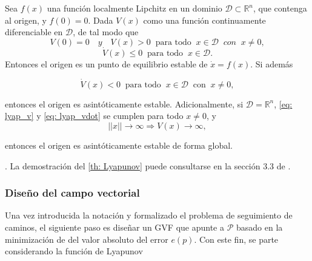 \begin{theorem}
    \label{th: Lyapunov}
    Sea $f(x)$ una función localmente Lipchitz en un dominio $\mathcal{D} \subset \mathds{R}^n$, que contenga al origen, y $f(0) = 0$. Dada $V(x)$ como una función continuamente diferenciable en $\mathcal{D}$, de tal modo que
    \begin{equation} \label{eq: lyap_v}
        V(0) = 0 \quad \textit{y} \quad V(x) > 0 \;\; \text{para todo} \;\; x \in \mathcal{D} \;\; con \;\; x \neq 0,
    \end{equation} 
    \begin{equation} \label{eq: lyap_vdot}
        \dot V(x) \leq 0 \;\; \text{para todo} \;\; x \in \mathcal{D}.
    \end{equation}
    Entonces el origen es un punto de equilibrio estable de $\dot x = f(x)$. Si además

    \begin{equation}
        \dot V(x) < 0 \;\; \text{para todo} \;\; x \in \mathcal{D} \;\; \text{con} \;\; x \neq 0,
    \end{equation}

    entonces el origen es asintóticamente estable. Adicionalmente, si $\mathcal{D} = \mathds{R}^n$, \eqref{eq: lyap_v} y \eqref{eq: lyap_vdot} se cumplen para todo $x \neq 0$, y
    \begin{equation}
        ||x|| \rightarrow \infty \Rightarrow V(x) \rightarrow \infty,
    \end{equation}

    entonces el origen es asintóticamente estable de forma global.
\end{theorem}

. La demostración del \autoref{th: Lyapunov} puede consultarse en la sección 3.3 de \cite{khalil}.


\subsubsection{Diseño del campo vectorial}

Una vez introducida la notación y formalizado el problema de seguimiento de caminos, el siguiente paso es diseñar un GVF que apunte a $\mathcal{P}$ basado en la minimización de del valor absoluto del error $e(p)$. Con este fin, se parte considerando la función de Lyapunov


